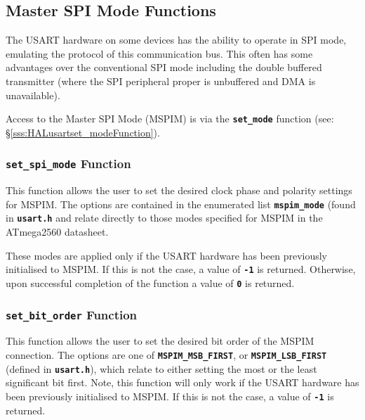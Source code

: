\documentclass[a4paper, oneside, 11pt, titlepage, onecolumn, openright]{report}
\begin{document}
				\subsection{Master SPI Mode Functions}
					\label{ss:Hardware Abstraction Libraries:usart Module:Master SPI Mode Functions}
			
					The USART hardware on some devices has the ability to operate in SPI mode, emulating the protocol of this communication bus. This often has some advantages over the conventional SPI mode including the double buffered transmitter (where the SPI peripheral proper is unbuffered and DMA is unavailable).
			
Access to the Master SPI Mode (MSPIM) is via the \textbf{\texttt{set\_mode}} function (see: \S\ref{sss:HALusartset_modeFunction}).
				
					\subsubsection{\textbf{\texttt{set\_spi\_mode}} Function}
						\label{sss:Hardware Abstraction Libraries:usart Module:Master SPI Mode Functions:set_spi_mode Function}
			
						This function allows the user to set the desired clock phase and polarity settings for MSPIM. The options are contained in the enumerated list \textbf{\texttt{mspim\_mode}} (found in \textbf{\texttt{usart.h}} and relate directly to those modes specified for MSPIM in the ATmega2560 datasheet.
			
These modes are applied only if the USART hardware has been previously initialised to MSPIM. If this is not the case, a value of \textbf{\texttt{-1}} is returned. Otherwise, upon successful completion of the function a value of \textbf{\texttt{0}} is returned.
			
					\subsubsection{\textbf{\texttt{set\_bit\_order}} Function}
						\label{sss:Hardware Abstraction Libraries:usart Module:Master SPI Mode Functions:set_bit_order Function}
			
						This function allows the user to set the desired bit order of the MSPIM connection. The options are one of \textbf{\texttt{MSPIM\_MSB\_FIRST}}, or \textbf{\texttt{MSPIM\_LSB\_FIRST}} (defined in \textbf{\texttt{usart.h}}), which relate to either setting the most or the least significant bit first. Note, this function will only work if the USART hardware has been previously initialised to MSPIM. If this is not the case, a value of \textbf{\texttt{-1}} is returned. 
			
\end{document}
